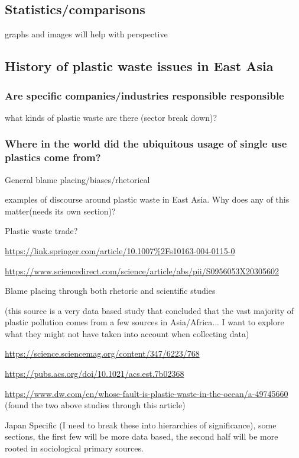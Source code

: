 \documentclass{book}\usepackage{knitr}
\begin{document}
{\subsection{Statistics/comparisons}

graphs and images will help with perspective

\subsection{History of plastic waste issues in East Asia}

\subsubsection{Are specific companies/industries responsible responsible}

what kinds of plastic waste are there (sector break down)? 

\subsubsection{Where in the world did the ubiquitous usage of single use plastics come from?}

General blame placing/biases/rhetorical 

examples of discourse around plastic waste in East Asia. Why does any of this matter(needs its own section)?

Plastic waste trade? 

\url{https://link.springer.com/article/10.1007%2Fs10163-004-0115-0}

\url{https://www.sciencedirect.com/science/article/abs/pii/S0956053X20305602}

Blame placing through both rhetoric and scientific studies

(this source is a very data based study that concluded that the vast majority of plastic pollution comes from a few sources in Asia/Africa... I want to explore what they might not have taken into account when collecting data)

\url{https://science.sciencemag.org/content/347/6223/768}

\url{https://pubs.acs.org/doi/10.1021/acs.est.7b02368}

\url{https://www.dw.com/en/whose-fault-is-plastic-waste-in-the-ocean/a-49745660} (found the two above studies through this article)

Japan Specific (I need to break these into hierarchies of significance), some sections, the first  few will be more data based, the second half will be more rooted in sociological primary sources.

}
\end{document}
